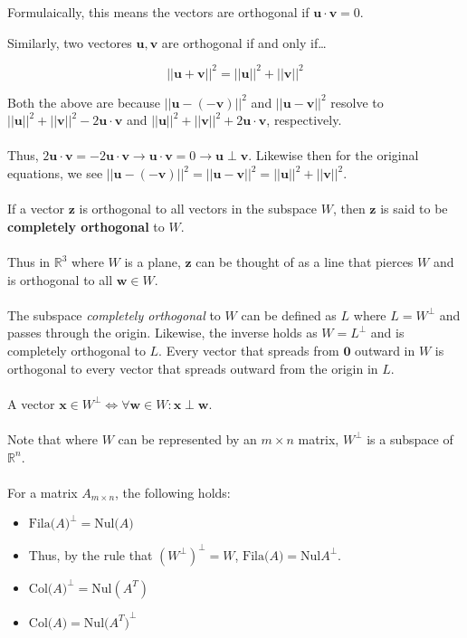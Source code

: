 \documentclass[12pt]{article}
\newcommand{\R}{\mathbb{R}}
\newcommand{\bt}[1]{\textbf{{#1}}}
\newcommand{\bm}[1]{\mathbf{{#1}}}
\newcommand{\norm}[1]{||{#1}||}
\begin{document}
Formulaically, this means the vectors are orthogonal if $\bm{u \cdot v} = 0$.

Similarly, two vectores $\bm{u,v}$ are orthogonal if and only if\dots

$$\norm{\bm{u +v}}^2 = \norm{\bm{u}}^2 + \norm{\bm{v}}^2$$

Both the above are because $\norm{\bm{u - (-v)}}^2$ and $\norm{\bm{u - v}}^2$ resolve
to $\norm{\bm{u}}^2 + \norm{\bm{v}}^2 - 2\bm{u \cdot v}$ and $\norm{\bm{u}}^2 + \norm{\bm{v}}^2 + 2\bm{u \cdot v}$, respectively. \\ \\

Thus, $2\bm{u \cdot v} = -2\bm{u \cdot v} \rightarrow \bm{u \cdot v} = 0 \rightarrow \bm{u \perp v}$. Likewise then for
the original equations, we see $\norm{\bm{u - (-v)}}^2 = \norm{\bm{u - v}}^2 = \norm{\bm{u}}^2 + \norm{\bm{v}}^2$. \\ \\ 


If a vector $\bm{z}$ is orthogonal to all vectors in the subspace $W$, then
$\bm{z}$ is said to be \bt{completely orthogonal} to $W$. \\ \\

Thus in $\R^3$ where $W$ is a plane, $\bm{z}$ can be thought of as a line
that pierces $W$ and is orthogonal to all $\bm{w} \in W$. \\ \\

The subspace \emph{completely orthogonal} to $W$ can be defined as $L$ where
$L = W^\perp$ and passes through the origin. Likewise, the inverse holds
as $W = L^\perp$ and is completely orthogonal to $L$. Every vector that spreads from
$\bm{0}$ outward in $W$ is orthogonal to every vector that spreads outward from the origin in $L$. \\ \\

A vector $\bm{x} \in W^\perp \iff \forall \bm{w} \in W: \bm{x} \perp \bm{w}$. \\ \\

Note that where $W$ can be represented by an $m \times n$ matrix, $W^\perp$ is a subspace of $\R^n$. \\ \\

For a matrix $A_{m \times n}$, the following holds:

\begin{itemize}
    \item $\textrm{Fila($A$)}^\perp = \textrm{Nul($A$)}$
    \item Thus, by the rule that ${(W^\perp)}^\perp = W$, $\textrm{Fila($A$)} = \textrm{Nul$A$}^\perp$.
    \item $\textrm{Col($A$)}^\perp = \textrm{Nul$(A^T)$}$
    \item $\textrm{Col($A$)} = \textrm{Nul$(A^T$)}^\perp$
\end{itemize}
\end{document}
